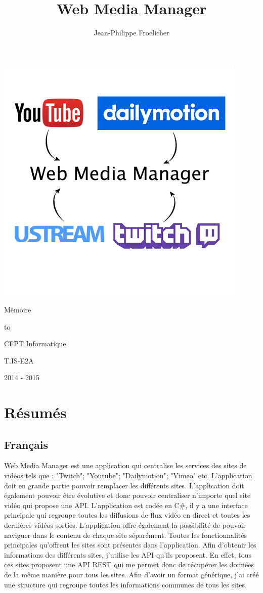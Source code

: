 \documentclass[11pt]{report} %
\title{Web Media Manager}
\author{Jean-Philippe Froelicher}
\date{} %
\makeatletter
\def\maketitle{%
	\null
	\thispagestyle{empty}%
	\vskip 1cm
	\begin{center}
		\Huge \strut \@title \par
		\large \strut Mêmoire
	\end{center}
	\ifhmode\par\fi
	\hbox to \hsize{\hfill
		\vrule height 2pt width.5\hsize
		\hfill}%
	\begin{center}
		\normalfont\large CFPT Informatique\par
		\normalfont\large\@author\par
		\normalfont T.IS-E2A
	\end{center}
	\begin{center}
		\normalfont\large 2014 - 2015
	\end{center}
	\par
	\vfil
	\vfil
	\null
	\cleardoublepage
}
\makeatother
\begin{document}
\includegraphics[width=0.9\textwidth]{../img/logoWebMediaManager.png}
\maketitle

\newpage

\tableofcontents

\chapter{Résumés}
	\section{Français}
		Web Media Manager est une application qui centralise les services des sites de vidéos tels que :
		"Twitch"; "Youtube"; "Dailymotion"; "Vimeo" etc. L'application doit en grande partie pouvoir remplacer les différents sites. L'application doit également pouvoir être évolutive et donc pouvoir
		centraliser n'importe quel site vidéo qui propose une API.
		L'application est codée en C\#, il y a une interface principale qui regroupe toutes les diffusions de
		flux vidéo en direct et toutes les dernières vidéos sorties. L'application offre également la possibilité de pouvoir naviguer dans le contenu de chaque site séparément. Toutes les fonctionnalités principales qu'offrent les sites sont présentes dans l'application.
		Afin d'obtenir les informations des différents sites, j'utilise les API qu'ils proposent. En effet, tous ces sites proposent une API REST qui me permet donc de récupérer les données de la même
		manière pour tous les sites. Afin d'avoir un format générique, j'ai créé une structure qui regroupe
		toutes les informations communes de tous les sites.
	
\end{document}
